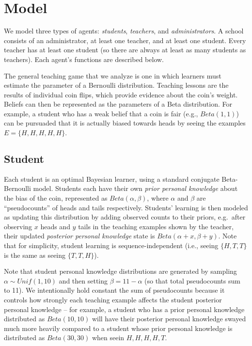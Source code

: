 \documentclass[10pt, letterpaper]{article}
\begin{document}
\section{Model}\label{model}

We model three types of agents: \emph{students}, \emph{teachers}, and
\emph{administrators}. A school consists of an administrator, at least
one teacher, and at least one student. Every teacher has at least one
student (so there are always at least as many students as teachers).
Each agent's functions are described below.

The general teaching game that we analyze is one in which learners must
estimate the parameter of a Bernoulli distribution. Teaching lessons are
the results of individual coin flips, which provide evidence about the
coin's weight. Beliefs can then be represented as the parameters of a
Beta distribution. For example, a student who has a weak belief that a
coin is fair (e.g., \(Beta(1,1)\)) can be pursuaded that it is actually
biased towards heads by seeing the examples \(E = \{H, H, H, H, H\}\).

\subsection{Student}\label{student}

Each student is an optimal Bayesian learner, using a standard conjugate
Beta-Bernoulli model. Students each have their own \emph{prior personal
knowledge} about the bias of the coin, represented as
\(Beta(\alpha,\beta)\), where \(\alpha\) and \(\beta\) are
``pseudocounts'' of heads and tails respectively. Students' learning is
then modeled as updating this distribution by adding observed counts to
their priors, e.g.~after observing \(x\) heads and \(y\) tails in the
teaching examples shown by the teacher, their updated \emph{posterior
personal knowledge} state is \(Beta(\alpha + x, \beta + y)\). Note that
for simplicity, student learning is sequence-independent (i.e., seeing
\(\{H, T, T\}\) is the same as seeing \(\{T, T, H\}\)).

Note that student personal knowledge distributions are generated by
sampling \(\alpha \sim Unif(1,10)\) and then setting
\(\beta = 11 - \alpha\) (so that total pseudocounts sum to 11). We
intentionally hold constant the sum of pseudocounts because it controls
how strongly each teaching example affects the student posterior
personal knowledge -- for example, a student who has a prior personal
knowledge distributed as \(Beta(10,10)\) will have their posterior
personal knowledge swayed much more heavily compared to a student whose
prior personal knowledge is distributed as \(Beta(30,30)\) when seein
\({H, H, H, H, T}\).
\end{document}
